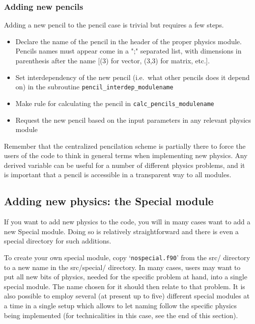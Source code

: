 \documentclass[\mydriver,12pt,twoside,notitlepage,a4paper]{article}
\makeatletter
\newcommand{\code}[1]{\texttt{#1}}
\newcommand{\file}[2][]{%
  \def\index@{#1}%
  `\texttt{#2}'%
  \ifx\index@\@empty\index[file]{#2@\texttt{#2}}%
  \else\index[file]{#1@\texttt{#1}}%
  \fi%
}
\makeatother
\begin{document}
\subsubsection{Adding new pencils}

Adding a new pencil to the pencil case is trivial but requires a few steps.
\begin{itemize}
  \item Declare the name of the pencil in the header of the proper physics
      module. Pencils names must appear come in a ";" separated list, with
      dimensions in parenthesis after the name [(3) for vector, (3,3) for
      matrix, etc.].
  \item Set interdependency of the new pencil (i.e.\ what other pencils does it
      depend on) in the subroutine \code{pencil_interdep_modulename}
  \item Make rule for calculating the pencil in \code{calc_pencils_modulename}
  \item Request the new pencil based on the input parameters in any relevant
      physics module
\end{itemize}
Remember that the centralized pencilation scheme is partially there to force
the users of the code to think in general terms when implementing new physics.
Any derived variable can be useful for a number of different physics problems,
and it is important that a pencil is accessible in a transparent way to all
modules.






\subsection{Adding new physics: the Special module}

If you want to add new physics to the code, you will in many cases want to
add a new Special module.  Doing so is relatively straightforward and
there is even a special directory for such additions.

To create your own special module, copy \file{nospecial.f90} from the src/
directory to a new name in the src/special/ directory.  
In many cases, users may want to put all new bits of physics, needed for the
specific problem at hand, into a single special module. The name chosen for it
should then relate to that problem. It is also possible to employ several
(at present up to five) different special modules at a time in a single setup
which allows to let naming follow the specific physics being implemented
(for technicalities
in this case, see the end of this section).
\end{document}
